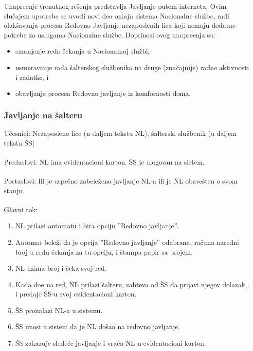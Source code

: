 Unapre\dj enje trenutnog re\v senja predstavlja Javljanje putem interneta. Ovim slu\v cajem upotrebe se uvodi novi deo onlajn sistema Nacionalne slu\v zbe, radi olak\v savanja procesa Redovno Javljanje nezaposlenih lica koji nemaju dodatne potrebe za uslugama Nacionalne slu\v zbe. Doprinosi ovog unapre\dj enja su:
\begin{itemize}
	\item smanjenje reda \v cekanja u Nacionalnoj slu\v zbi,
	\item usmeravanje rada \v salterskog slu\v zbenika na druge (zna\v cajnije) radne aktivnosti i zadatke, i
	\item obavljanje procesa Redovno javljanje iz komfornosti doma.
\end{itemize}

\subsubsection{Javljanje na \v salteru}
\label{su: javljanje na salteru}

\noindent U\v cesnici: Nezaposleno lice (u daljem tekstu NL), \v salterski slu\v zbenik (u daljem tekstu \v SS)
\\
\\ Preduslovi: NL ima evidentacioni karton. \v SS je ulogovan na sistem. 
\\
\\ Postuslovi: Ili je uspe\v sno zabele\v zeno javljanje NL-a ili je NL obave\v sten o svom stanju.
\\ 
\\ Glavni tok:
\begin{enumerate}
	\item NL prilazi automatu i bira opciju ''Redovno javljanje''.
	\item Automat bele\v zi da je opcija ''Redovno javljanje'' odabrana, ra\v cuna naredni broj u redu \v cekanja za tu opciju, i \v stampa papir sa brojem.
	\item NL uzima broj i \v ceka svoj red.
	\item Kada do\dj e na red, NL prilazi \v salteru, zahteva od \v SS da prijavi njegov dolazak, i predaje \v SS-u svoj evidentacioni karton.
	\item \v SS pronalazi NL-a u sistemu.
	\item \v SS unosi u sistem da je NL do\v sao na redovno javljanje.
	\item \v SS zakazuje slede\' ce javljanje i vra\' ca NL-u evidentacioni karton.
\end{enumerate}


